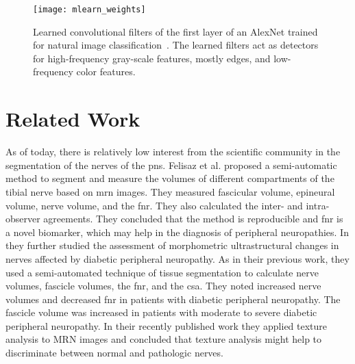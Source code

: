 \begin{figure}[htbp]
    \centering
	\texttt{[image: mlearn\_weights]}
    \caption[Learned Weights of a trained AlexNet]{Learned convolutional filters of the first layer of an AlexNet trained for natural image classification~\cite{Krizhevsky2012ImageNetNetworks}. The learned filters act as detectors for high-frequency gray-scale features, mostly edges, and low-frequency color features.}
    \label{fig:mlearn_weights}
\end{figure}

\section{Related Work} %
As of today, there is relatively low interest from the scientific community in the segmentation of the nerves of the \gls{pns}. Felisaz et al.\cite{Felisaz2016NerveMicro-neurography} proposed a semi-automatic method to segment and measure the volumes of different compartments of the tibial nerve based on \gls{mrn} images. They measured fascicular volume, epineural volume, nerve volume, and the \gls{fnr}. They also calculated the inter- and intra-observer agreements. They concluded that the method is reproducible and \gls{fnr} is a novel biomarker, which may help in the diagnosis of peripheral neuropathies.
In \cite{Felisaz2017MRNeuropathy.} they further studied the assessment of morphometric ultrastructural changes in nerves affected by diabetic peripheral neuropathy. As in their previous work, they used a semi-automated technique of tissue segmentation to calculate nerve volumes, fascicle volumes, the \gls{fnr}, and the \gls{csa}. They noted increased nerve volumes and decreased \gls{fnr} in patients with diabetic peripheral neuropathy. The fascicle volume was increased in patients with moderate to severe diabetic peripheral neuropathy.
In their recently published work \cite{FelisazTextureNeuropathy} they applied texture analysis to MRN images and concluded that texture analysis might help to discriminate between normal and pathologic nerves.\\
